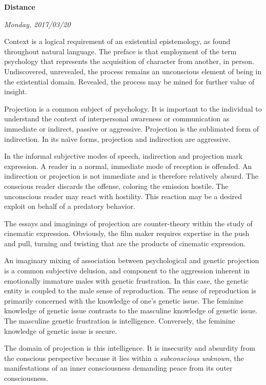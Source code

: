 

\centerline{\bf Distance}
\centerline{\it Monday, 2017/03/20}



\vfill
\break

Context is a logical requirement of an existential epistemology, as
found throughout natural language.  The preface is that employment of
the term psychology that represents the acquisition of character from
another, in person.  Undiscovered, unrevealed, the process remains an
unconscious element of being in the existential domain.  Revealed, the
process may be mined for further value of insight.

Projection is a common subject of psychology.  It is important to the
individual to understand the context of interpersonal awareness or
communication as immediate or indirect, passive or aggressive.
Projection is the sublimated form of indirection.  In its na\"{\i}ve
forms, projection and indirection are aggressive.  

In the informal subjective modes of speech, indirection and projection
mark expression.  A reader in a normal, immediate mode of reception is
offended.  An indirection or projection is not immediate and is
therefore relatively absurd.  The conscious reader discards the
offense, coloring the emission hostile.  The unconscious reader may
react with hostility.  This reaction may be a desired exploit on
behalf of a predatory behavior.

The essays and imaginings of projection are counter-theory within the
study of cinematic expression.  Obviously, the film maker requires
expertise in the push and pull, turning and twisting that are the
products of cinematic expression.

An imaginary mixing of association between psychological and genetic
projection is a common subjective delusion, and component to the
aggression inherent in emotionally immature males with genetic
frustration.  In this case, the genetic entity is coupled to the male
sense of reproduction.  The sense of reproduction is primarily
concerned with the knowledge of one's genetic issue.  The feminine
knowledge of genetic issue contrasts to the masculine knowledge of
genetic issue.  The masculine genetic frustration is intelligence.
Conversely, the feminine knowledge of genetic issue is secure.

The domain of projection is this intelligence.  It is insecurity and
absurdity from the conscious perspective because it lies within a {\it
subconscious unknown}, the manifestations of an inner consciousness
demanding peace from its outer consciousness.  

